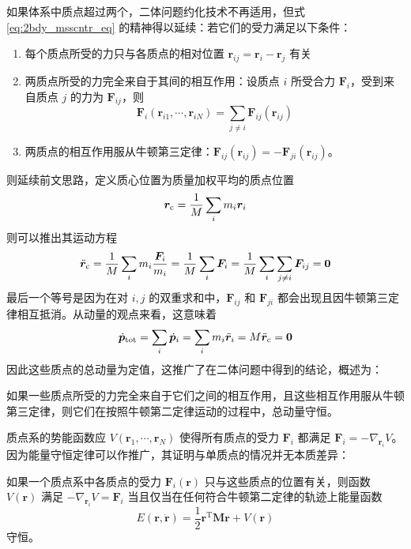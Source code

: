 \documentclass[cn,10pt,math=newtx,citestyle=gb7714-2015,bibstyle=gb7714-2015]{elegantbook}
\def\bm{\boldsymbol}
\def\mbf{\mathbf}
\def\T{\mathrm T}
\begin{document}
如果体系中质点超过两个，二体问题约化技术不再适用，但式 \ref{eq:2bdy_msscntr_eq} 的精神得以延续：若它们的受力满足以下条件：
\begin{enumerate}
    \item 每个质点所受的力只与各质点的相对位置 $\bm r_{ij}=\bm r_i-\bm r_j$ 有关
    \item 两质点所受的力完全来自于其间的相互作用：设质点 $i$ 所受合力 $\bm F_i$，受到来自质点 $j$ 的力为 $\bm F_{ij}$，则
    \begin{equation*}
        \bm F_i(\bm r_{i1},\cdots,\bm r_{iN}) = \sum_{j\ne i}\bm F_{ij}(\bm r_{ij})
    \end{equation*}
    \item 两质点的相互作用服从牛顿第三定律：$\bm F_{ij}(\bm r_{ij}) = -\bm F_{ji}(\bm r_{ij})$。
\end{enumerate}
则延续前文思路，定义质心位置为质量加权平均的质点位置
\begin{equation*}
    \bm r_\text c=\frac{1}{M}\sum_i m_i\bm r_i
\end{equation*}
则可以推出其运动方程
\begin{equation}
    \ddot{\bm r}_\text c=\frac{1}{M}\sum_i m_i\frac{\bm F_i}{m_i} = \frac{1}{M}\sum_i\bm F_i = \frac{1}{M}\sum_i\sum_{j\ne i}\bm F_{ij}=\bm 0
\end{equation}
最后一个等号是因为在对 $i,j$ 的双重求和中，$\bm F_{ij}$ 和 $\bm F_{ji}$ 都会出现且因牛顿第三定律相互抵消。从动量的观点来看，这意味着
\begin{equation*}
    \dot{\bm p}_\text{tot}=\sum_i\dot{\bm p}_i = \sum_i m_i\ddot{\bm r}_i=M\ddot{\bm r}_\text c=\bm 0
\end{equation*}
因此这些质点的总动量为定值，这推广了在二体问题中得到的结论，概述为：
\begin{theorem}[动量守恒定律-v1.0]\label{mmntm_cnsrv_1.0}
    如果一些质点所受的力完全来自于它们之间的相互作用，且这些相互作用服从牛顿第三定律，则它们在按照牛顿第二定律运动的过程中，总动量守恒。
\end{theorem}

质点系的势能函数应 $V(\bm r_1,\cdots,\bm r_N)$ 使得所有质点的受力 $\bm F_i$ 都满足 $\bm F_i = -\nabla_{\bm r_i}V$。因为能量守恒定律可以作推广，其证明与单质点的情况并无本质差异：
\begin{theorem}[能量守恒定律-v1.1]\label{thm:enrgy_cnvrs}
    如果一个质点系中各质点的受力 $\bm F_i(\bm r)$ 只与这些质点的位置有关，则函数 $V(\bm r)$ 满足 $-\nabla_{\bm r_i} V=\bm F_i$ 当且仅当在任何符合牛顿第二定律的轨迹上能量函数
    \begin{equation*}
        E(\bm r,\dot{\bm r})=\frac{1}{2}\bm r^\T \mbf M\bm r+V(\bm r)
    \end{equation*}
    守恒。
\end{theorem}
\end{document}
